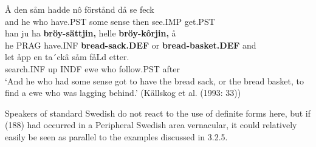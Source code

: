 \ea\label{}
\gll Å  den  såm  hadde  nô  förstånd  då  se  feck\\


and  he  who  have.PST  some  sense  then  see.IMP  get.PST\\ %


\ea\label{}
\gll han  ju  ha  \textbf{bröy-sättjin,} helle  \textbf{bröy-kôrjin,} å\\


he  PRAG  have.INF  \textbf{bread-sack.DEF} or  \textbf{bread-basket.DEF} and\\ %


\ea\label{}
\gll le{\textasciigrave}t  åpp  en  ta´ckâ  såm  fåLd  etter.\\


search.INF  up  INDF  ewe  who  follow.PST  after\\ %


 ‘And he who had some sense got to have the bread sack, or the bread basket, to find a ewe who was lagging behind.’ (Källskog et al. (1993: 33))
\z

Speakers of standard Swedish do not react to the use of definite forms here, but if (188) had occurred in a Peripheral Swedish area vernacular, it could relatively easily be seen as parallel to the examples discussed in 3.2.5.

